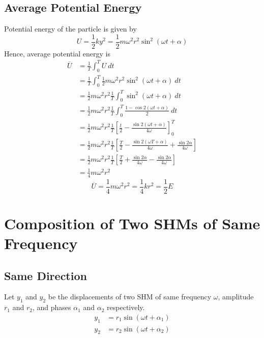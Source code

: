 \documentclass[12pt]{article}
\numberwithin{equation}{subsection}
\begin{document}
\subsection{Average Potential Energy}
Potential energy of the particle is given by
\begin{equation}
    U = \frac{1}{2} k y^2 = \frac{1}{2} m \omega^2 r^2 \sin^2{(\omega t + \alpha)}
\end{equation}
Hence, average potential energy is
\begin{align*}
    \overline{U} &= \frac{1}{T} \int_{0}^{T} U \: dt \\
    &= \frac{1}{T} \int_{0}^{T} \frac{1}{2} m \omega^2 r^2 \sin^2{(\omega t + \alpha)} \: dt \\
    &= \frac{1}{2} m \omega^2 r^2 \frac{1}{T} \int_{0}^{T} \sin^2{(\omega t + \alpha)} \: dt \\
    &= \frac{1}{2} m \omega^2 r^2 \frac{1}{T} \int_{0}^{T} \frac{1 - \cos{2(\omega t + \alpha)}}{2} \: dt \\
    &= \frac{1}{2} m \omega^2 r^2 \frac{1}{T} \left[ \frac{t}{2} - \frac{\sin{2(\omega t + \alpha)}}{4\omega} \right]_{0}^{T} \\
    &= \frac{1}{2} m \omega^2 r^2 \frac{1}{T} \left[ \frac{T}{2} - \frac{\sin{2(\omega T + \alpha)}}{4\omega} + \frac{\sin{2\alpha}}{4\omega} \right] \\
    &= \frac{1}{2} m \omega^2 r^2 \frac{1}{T} \left[ \frac{T}{2} + \frac{\sin{2\alpha}}{4\omega} - \frac{\sin{2\alpha}}{4\omega} \right] \\
    &= \frac{1}{4} m \omega^2 r^2
\end{align*}
\begin{equation}
    \boxed{ \overline{U} = \frac{1}{4} m \omega^2 r^2 = \frac{1}{4}k r^2 = \frac{1}{2} E }
\end{equation}

\section{Composition of Two SHMs of Same Frequency}
\subsection{Same Direction}

Let $y_1$ and $y_2$ be the displacements of two SHM of same frequency $\omega$, amplitude $r_1$ and $r_2$, and phases $\alpha_1$ and $\alpha_2$ respectively. \\
\begin{align}
    y_1 &= r_1 \sin{(\omega t + \alpha_1)} \\
    y_2 &= r_2 \sin{(\omega t + \alpha_2)}
\end{align}
\end{document}

